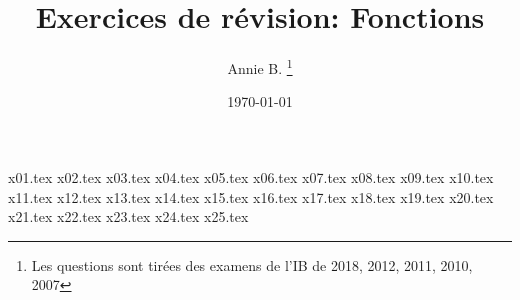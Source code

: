 \documentclass[10pt]{article}
\newcounter{question}
\begin{document}
 

\title{Exercices de révision: Fonctions}
\author{Annie B. \thanks{Les questions sont tirées des examens de l’IB de 2018, 2012, 2011, 2010, 2007}}
\date{\today}
\maketitle

\newpage
{x01.tex}
\bigskip
{x02.tex}
\bigskip
{x03.tex}
\bigskip
{x04.tex}
\bigskip
{x05.tex}
\bigskip
{x06.tex}
\bigskip
{x07.tex}
\bigskip
{x08.tex}
\bigskip
{x09.tex}
\bigskip
{x10.tex}
\bigskip
{x11.tex}
\bigskip
{x12.tex}
\bigskip
{x13.tex}
\bigskip
{x14.tex}
\bigskip
{x15.tex}
\bigskip
{x16.tex}
\bigskip
{x17.tex}
\bigskip
{x18.tex}
\bigskip
{x19.tex}
\bigskip
{x20.tex}
\bigskip
{x21.tex}
\bigskip
{x22.tex}
\bigskip
{x23.tex}
\bigskip
{x24.tex}
\bigskip
{x25.tex}
\end{document}

